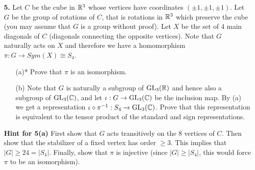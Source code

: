 \documentclass[12pt]{amsart}
\begin{document}
 


\skv
{\bf 5.} Let $C$ be the cube in ${\mathbb R}^3$ whose vertices have coordinates 
$(\pm 1, \pm 1,\pm 1)$. Let $G$ be the group of rotations of $C$, that is rotations in ${\mathbb R}^3$ which preserve the cube (you may assume that $G$ is a group without proof). Let $X$ be the set of $4$ main diagonals of $C$ (diagonals
connecting the opposite vertices). Note that $G$ naturally acts on $X$ and therefore we have a homomorphism $\pi:G\to Sym(X)\cong S_4$.
\begin{itemize}
\item[(a)*] Prove that $\pi$ is an isomorphism.
\item[(b)] Note that $G$ is naturally a subgroup of ${\rm GL}_3({\mathbb R})$ and hence
also a subgroup of ${\rm GL}_3({\mathbb C})$, and let $\iota: G\to {\rm GL}_3({\mathbb C})$
be the inclusion map. By (a) we get a representation $\iota\circ \pi^{-1}:
S_4\to{\rm GL}_3({\mathbb C})$. Prove that this representation is equivalent to the tensor product of the standard and sign representations.
\end{itemize}
\newpage
{\bf Hint for 5(a)} First show that $G$ acts transitively on the 8 vertices of $C$. Then show that the stabilizer of a fixed vertex has order $\geq 3$. This implies that $|G|\geq 24=|S_4|$. Finally, show that $\pi$ is injective (since $|G|\geq |S_4|$, this would force $\pi$ to be an isomorphism).
\end{document}
